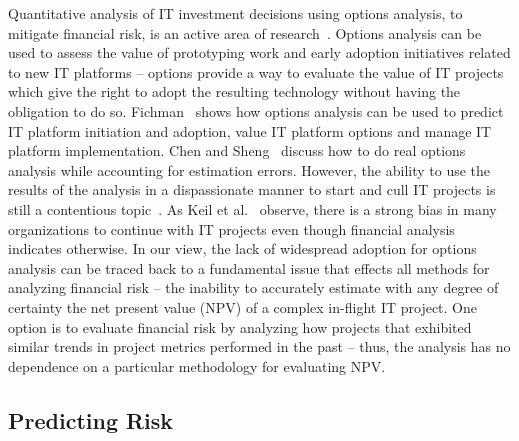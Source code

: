 Quantitative analysis of IT investment decisions using options analysis, to mitigate financial risk, is an active area of research~\cite{14,15,16}. Options analysis can be used to assess the value of prototyping work and early adoption initiatives related to new IT platforms -- options provide a way to evaluate the value of IT projects which give the right to adopt the resulting technology without having the obligation to do so. Fichman~\cite{risk14} shows how options analysis can be used to predict IT platform initiation and adoption, value IT platform options and manage IT platform implementation. Chen and Sheng~\cite{risk15} discuss how to do real options analysis while accounting for estimation errors. However, the ability to use the results of the analysis in a dispassionate manner to start and cull IT projects is still a contentious topic~\cite{risk17}. As Keil et al.~\cite{risk18} observe, there is a strong bias in many organizations to continue with IT projects even though financial analysis indicates otherwise. In our view, the lack of widespread adoption for options analysis can be traced back to a fundamental issue that effects all methods for analyzing financial risk -- the inability to accurately estimate with any degree of certainty the net present value (NPV) of a complex in-flight IT project. One option is to evaluate financial risk by analyzing how projects that exhibited similar trends in project metrics performed in the past -- thus, the analysis has no dependence on a particular methodology for evaluating NPV.

\subsection{Predicting Risk}

